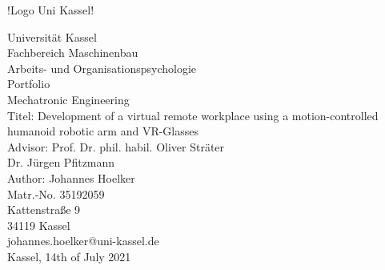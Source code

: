 !Logo Uni Kassel!
\begin{center}
Universität Kassel\\
Fachbereich Maschinenbau\\
Arbeits- und Organisationspsychologie\\
Portfolio\\
Mechatronic Engineering\\
Titel: Development of a virtual remote workplace using a motion-controlled humanoid robotic arm and VR-Glasses\\
Advisor: Prof. Dr. phil. habil. Oliver Sträter\\
Dr. Jürgen Pfitzmann\\
Author: Johannes Hoelker\\
Matr.-No. 35192059\\
Kattenstraße 9\\
34119 Kassel\\
johannes.hoelker@uni-kassel.de\\
Kassel, 14th of July 2021
\end{center}